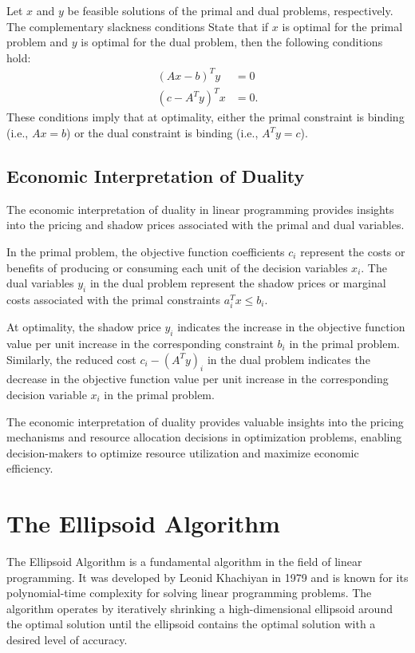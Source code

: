 \documentclass[12pt]{book} %
\begin{document}
Let \(x\) and \(y\) be feasible solutions of the primal and dual problems, respectively. The complementary slackness conditions State that if \(x\) is optimal for the primal problem and \(y\) is optimal for the dual problem, then the following conditions hold:
\begin{align*}
(Ax - b)^T y & = 0 \\
(c - A^T y)^T x & = 0.
\end{align*}
These conditions imply that at optimality, either the primal constraint is binding (i.e., \(Ax = b\)) or the dual constraint is binding (i.e., \(A^T y = c\)).

\subsection{Economic Interpretation of Duality}
The economic interpretation of duality in linear programming provides insights into the pricing and shadow prices associated with the primal and dual variables.

In the primal problem, the objective function coefficients \(c_i\) represent the costs or benefits of producing or consuming each unit of the decision variables \(x_i\). The dual variables \(y_i\) in the dual problem represent the shadow prices or marginal costs associated with the primal constraints \(a_i^T x \leq b_i\). 

At optimality, the shadow price \(y_i\) indicates the increase in the objective function value per unit increase in the corresponding constraint \(b_i\) in the primal problem. Similarly, the reduced cost \(c_i - (A^T y)_i\) in the dual problem indicates the decrease in the objective function value per unit increase in the corresponding decision variable \(x_i\) in the primal problem.

The economic interpretation of duality provides valuable insights into the pricing mechanisms and resource allocation decisions in optimization problems, enabling decision-makers to optimize resource utilization and maximize economic efficiency.


\section{The Ellipsoid Algorithm}

The Ellipsoid Algorithm is a fundamental algorithm in the field of linear programming. It was developed by Leonid Khachiyan in 1979 and is known for its polynomial-time complexity for solving linear programming problems. The algorithm operates by iteratively shrinking a high-dimensional ellipsoid around the optimal solution until the ellipsoid contains the optimal solution with a desired level of accuracy.
\end{document}
